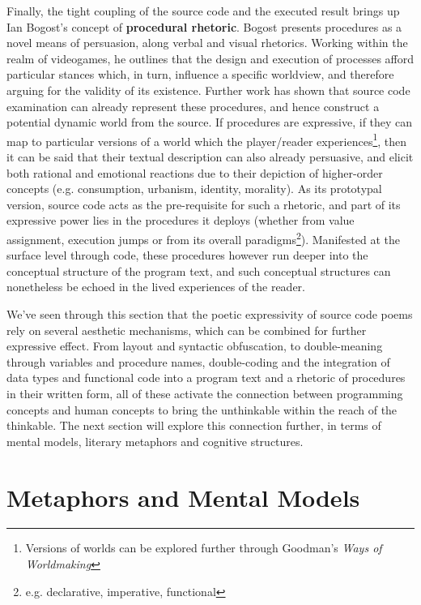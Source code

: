 \documentclass{article}
\begin{document}
Finally, the tight coupling of the source code and the executed result brings up Ian Bogost's concept of \textbf{procedural rhetoric}\cite{bogost_rhetoric_2007}. Bogost presents procedures as a novel means of persuasion, along verbal and visual rhetorics. Working within the realm of videogames, he outlines that the design and execution of processes afford particular stances which, in turn, influence a specific worldview, and therefore arguing for the validity of its existence. Further work has shown that source code examination can already represent these procedures, and hence construct a potential dynamic world from the source\cite{tirrell_dumb_2012}. If procedures are expressive, if they can map to particular versions of a world which the player/reader experiences\footnote{Versions of worlds can be explored further through Goodman's \emph{Ways of Worldmaking}}, then it can be said that their textual description can also already persuasive, and elicit both rational and emotional reactions due to their depiction of higher-order concepts (e.g. consumption, urbanism, identity, morality). As its prototypal version, source code acts as the pre-requisite for such a rhetoric, and part of its expressive power lies in the procedures it deploys (whether from value assignment, execution jumps or from its overall paradigms\footnote{e.g. declarative, imperative, functional}). Manifested at the surface level through code, these procedures however run deeper into the conceptual structure of the program text, and such conceptual structures can nonetheless be echoed in the lived experiences of the reader.

We've seen through this section that the poetic expressivity of source code poems rely on several aesthetic mechanisms, which can be combined for further expressive effect. From layout and syntactic obfuscation, to double-meaning through variables and procedure names, double-coding and the integration of data types and functional code into a program text and a rhetoric of procedures in their written form, all of these activate the connection between programming concepts and human concepts to bring the unthinkable within the reach of the thinkable. The next section will explore this connection further, in terms of mental models, literary metaphors and cognitive structures.

\section{Metaphors and Mental Models}
\end{document}
